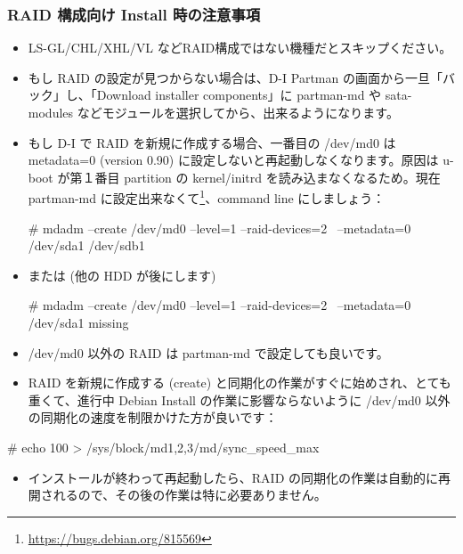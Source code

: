\documentclass[mingoth,a4paper]{jsarticle}
\begin{document}
\subsubsection{RAID 構成向け Install 時の注意事項}
\begin{itemize}
\item LS-GL/CHL/XHL/VL などRAID構成ではない機種だとスキップください。
\item もし RAID の設定が見つからない場合は、D-I Partman の画面から一旦「バック」し、「Download installer components」に partman-md や sata-modules などモジュールを選択してから、出来るようになります。
\item もし D-I で RAID を新規に作成する場合、一番目の /dev/md0 は metadata=0 (version 0.90) に設定しないと再起動しなくなります。原因は u-boot が第１番目 partition の kernel/initrd を読み込まなくなるため。現在 partman-md に設定出来なくて\footnote{\url{https://bugs.debian.org/815569}}、command line にしましょう：
\begin{commandline}
# mdadm --create /dev/md0 --level=1 --raid-devices=2 \
  --metadata=0 /dev/sda1 /dev/sdb1
\end{commandline}
\item または (他の HDD が後にします)
\begin{commandline}
# mdadm --create /dev/md0 --level=1 --raid-devices=2 \
  --metadata=0 /dev/sda1 missing
\end{commandline}
\item /dev/md0 以外の RAID は partman-md で設定しても良いです。
\item RAID を新規に作成する (create) と同期化の作業がすぐに始めされ、とても重くて、進行中 Debian Install の作業に影響ならないように /dev/md0 以外の同期化の速度を制限かけた方が良いです：
\end{itemize}
\begin{commandline}
# echo 100 > /sys/block/md{1,2,3}/md/sync_speed_max
\end{commandline}
\begin{itemize}
\item インストールが終わって再起動したら、RAID の同期化の作業は自動的に再開されるので、その後の作業は特に必要ありません。
\end{itemize}
\end{document}
